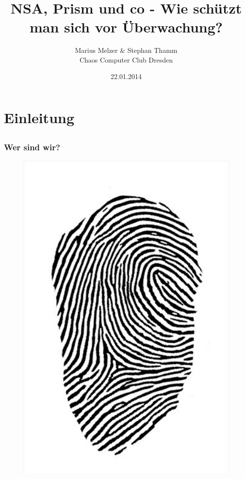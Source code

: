 \documentclass[12pt]{beamer}
\title{NSA, Prism und co - Wie schützt man sich vor Überwachung?}
\author{\small Marius Melzer \& Stephan Thamm\\\large Chaos Computer Club Dresden}
\date{22.01.2014}
\begin{document}
\maketitle

\section{Einleitung}
\subsection{}

\begin{frame}
  \frametitle{Wer sind wir?}
  \begin{figure}
    \includegraphics[height=0.7\textheight]{img/fingerabdruck.jpg}
  \end{figure}
\end{frame}
\end{document}
